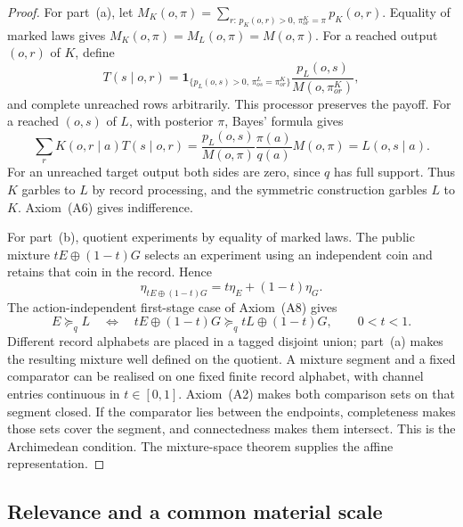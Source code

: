 \documentclass[11pt,a4paper]{article}
\theoremstyle{definition}
\newcommand{\1}{\mathbf 1}
\begin{document}
\begin{proof}
For part~\textup{(a)}, let
$M_K(o,\pi)=\sum_{r:\,p_K(o,r)>0,\,\pi^K_{or}=\pi}p_K(o,r)$.
Equality of marked laws gives $M_K(o,\pi)=M_L(o,\pi)=M(o,\pi)$.
For a reached output $(o,r)$ of $K$, define
\begin{equation}
T(s\mid o,r)=
\1_{\{p_L(o,s)>0,\,\pi^L_{os}=\pi^K_{or}\}}
\frac{p_L(o,s)}{M(o,\pi^K_{or})},
\label{lf:eq:matching-processor}
\end{equation}
and complete unreached rows arbitrarily.  This processor preserves the
payoff.  For a reached $(o,s)$ of $L$, with posterior $\pi$,
Bayes' formula gives
\[
\sum_r K(o,r\mid a)T(s\mid o,r)
=\frac{p_L(o,s)}{M(o,\pi)}\frac{\pi(a)}{q(a)}M(o,\pi)
=L(o,s\mid a).
\]
For an unreached target output both sides are zero, since $q$ has full
support.  Thus $K$ garbles to $L$ by record processing, and the symmetric
construction garbles $L$ to $K$.  Axiom~\textup{(A6)} gives indifference.

For part~\textup{(b)}, quotient experiments by equality of marked laws.
The public mixture \mbox{$tE\oplus(1-t)G$} selects an experiment using an independent
coin and retains that coin in the record.  Hence
\begin{equation}
\eta_{tE\oplus(1-t)G}=t\eta_E+(1-t)\eta_G.
\label{lf:eq:public-mixture}
\end{equation}
The action-independent first-stage case of Axiom~\textup{(A8)} gives
\begin{equation}
E\succeq_q L
\quad\Longleftrightarrow\quad
tE\oplus(1-t)G\succeq_q tL\oplus(1-t)G,
\qquad 0<t<1.
\label{lf:eq:mixture-independence}
\end{equation}
Different record alphabets are placed in a tagged disjoint union;
part~\textup{(a)} makes the resulting mixture well defined on the quotient.
A mixture segment and a fixed comparator can be realised on one fixed
finite record alphabet, with channel entries continuous in $t\in[0,1]$.
Axiom~\textup{(A2)} makes both comparison sets on that segment closed.
If the comparator lies between the endpoints, completeness makes those sets
cover the segment, and connectedness makes them intersect.  This is the
Archimedean condition.  The mixture-space theorem
\cite{HersteinMilnor1953} supplies the affine representation.
\end{proof}

\subsection{Relevance and a common material scale}
\end{document}
